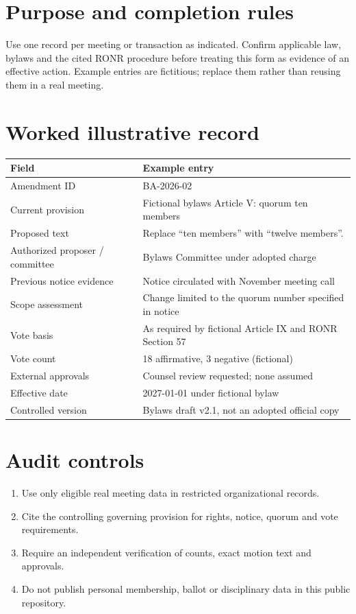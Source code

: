 \documentclass[11pt]{article}
\begin{document}
\SuiteOpen
\section{Purpose and completion rules}
Use one record per meeting or transaction as indicated. Confirm applicable law, bylaws and the cited RONR procedure before treating this form as evidence of an effective action. Example entries are fictitious; replace them rather than reusing them in a real meeting.

\section{Worked illustrative record}
\begin{longtable}{@{}p{.38\linewidth}p{.55\linewidth}@{}}\toprule Field & Example entry\\\midrule\endhead


Amendment ID & BA-2026-02\\
Current provision & Fictional bylaws Article V: quorum ten members\\
Proposed text & Replace “ten members” with “twelve members”.\\
Authorized proposer / committee & Bylaws Committee under adopted charge\\
Previous notice evidence & Notice circulated with November meeting call\\
Scope assessment & Change limited to the quorum number specified in notice\\
Vote basis & As required by fictional Article IX and RONR Section 57\\
Vote count & 18 affirmative, 3 negative (fictional)\\
External approvals & Counsel review requested; none assumed\\
Effective date & 2027-01-01 under fictional bylaw\\
Controlled version & Bylaws draft v2.1, not an adopted official copy\\
\bottomrule\end{longtable}
\section{Audit controls}
\begin{enumerate}[leftmargin=*,itemsep=4pt]
\item Use only eligible real meeting data in restricted organizational records.
\item Cite the controlling governing provision for rights, notice, quorum and vote requirements.
\item Require an independent verification of counts, exact motion text and approvals.
\item Do not publish personal membership, ballot or disciplinary data in this public repository.
\end{enumerate}
\end{document}
